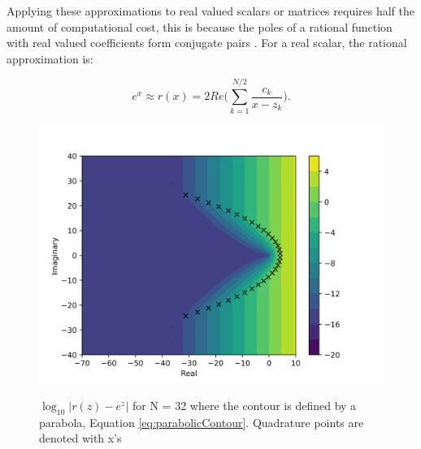 Applying these approximations to real valued scalars or matrices requires half the amount of computational cost, this is because the poles of a rational function with real valued coefficients form conjugate pairs \cite{pusa2011}. For a real scalar, the rational approximation is:

\begin{equation}
    e^{x} \approx r(x) = 2Re\bigg(\sum_{k=1}^{N/2}\frac{c_{k}}{x - z_{k}}\bigg).
\end{equation}

\clearpage

\begin{figure}[p]
  \centering
  \includegraphics[width=5in]{images/chapter-3/RationApproxParabolicError32.png}\\
  \caption{$\log_{10}|r(z)-e^{z}|$ for N = 32 where the contour is defined by a parabola, Equation \ref{eq:parabolicContour}. Quadrature points are denoted with x's}
  \label{fig:complexRationalApproxParabola}
\end{figure} 

\clearpage


